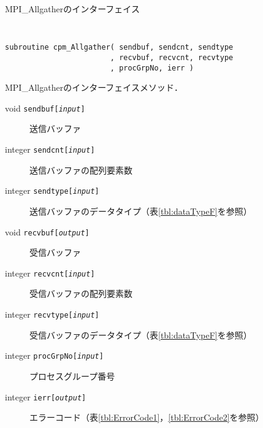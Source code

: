 \begin{spacing}{0.8}
\begin{itembox}[l]{MPI\_Allgatherのインターフェイス}
{\tt
\begin{verbatim}
subroutine cpm_Allgather( sendbuf, sendcnt, sendtype
                        , recvbuf, recvcnt, recvtype
                        , procGrpNo, ierr )
\end{verbatim}
}
MPI\_Allgatherのインターフェイスメソッド．
\begin{description}
\item[void    {\tt sendbuf[{\it input}]}] 送信バッファ
\item[integer {\tt sendcnt[{\it input}]}] 送信バッファの配列要素数
\item[integer {\tt sendtype[{\it input}]}] 送信バッファのデータタイプ（表\ref{tbl:dataTypeF}を参照）
\item[void    {\tt recvbuf[{\it output}]}] 受信バッファ
\item[integer {\tt recvcnt[{\it input}]}] 受信バッファの配列要素数
\item[integer {\tt recvtype[{\it input}]}] 受信バッファのデータタイプ（表\ref{tbl:dataTypeF}を参照）
\item[integer {\tt procGrpNo[{\it input}]}] プロセスグループ番号
\item[integer {\tt ierr[{\it output}]}] エラーコード（表\ref{tbl:ErrorCode1}，\ref{tbl:ErrorCode2}を参照）
\end{description}
\end{itembox}\\
\end{spacing}

